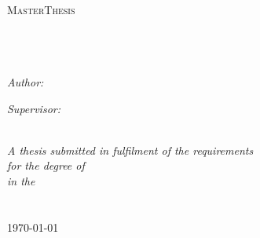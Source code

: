 \documentclass[11pt, oneside]{Thesis} %
\begin{document}
\begin{titlepage}
\begin{center}

\textsc{\LARGE \univname}\\[1.5cm] %
\textsc{\Large MasterThesis}\\[0.5cm] %

\HRule \\[0.4cm] %
{\huge \bfseries \ttitle}\\[0.4cm] %
\HRule \\[1.5cm] %
 
\begin{minipage}{0.4\textwidth}
\begin{flushleft} \large
\emph{Author:}\\
{\authornames} %
\end{flushleft}
\end{minipage}
\begin{minipage}{0.4\textwidth}
\begin{flushright} \large
\emph{Supervisor:} \\
{\supname} %
\end{flushright}
\end{minipage}\\[3cm]
 
\large \textit{A thesis submitted in fulfilment of the requirements\\ for the degree of \degreename}\\[0.3cm] %
\textit{in the}\\[0.4cm]
\groupname\\\deptname\\[2cm] %
 
{\large \today}\\[4cm] %
 
\vfill
\end{center}

\end{titlepage}


\end{document}
